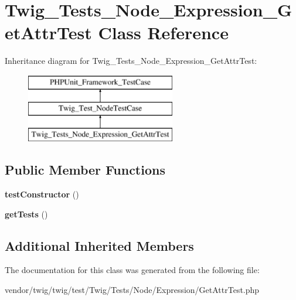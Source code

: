 \hypertarget{classTwig__Tests__Node__Expression__GetAttrTest}{}\section{Twig\+\_\+\+Tests\+\_\+\+Node\+\_\+\+Expression\+\_\+\+Get\+Attr\+Test Class Reference}
\label{classTwig__Tests__Node__Expression__GetAttrTest}
Inheritance diagram for Twig\+\_\+\+Tests\+\_\+\+Node\+\_\+\+Expression\+\_\+\+Get\+Attr\+Test\+:\begin{figure}[H]
\begin{center}
\leavevmode
\includegraphics[height=3.000000cm]{classTwig__Tests__Node__Expression__GetAttrTest}
\end{center}
\end{figure}
\subsection*{Public Member Functions}
\begin{DoxyCompactItemize}
\item 
{\bfseries test\+Constructor} ()\hypertarget{classTwig__Tests__Node__Expression__GetAttrTest_a60eada47fa6795d224dc5a6e51a8227a}{}\label{classTwig__Tests__Node__Expression__GetAttrTest_a60eada47fa6795d224dc5a6e51a8227a}

\item 
{\bfseries get\+Tests} ()\hypertarget{classTwig__Tests__Node__Expression__GetAttrTest_a5b411823e358ccc66a653d4241fb1756}{}\label{classTwig__Tests__Node__Expression__GetAttrTest_a5b411823e358ccc66a653d4241fb1756}

\end{DoxyCompactItemize}
\subsection*{Additional Inherited Members}


The documentation for this class was generated from the following file\+:\begin{DoxyCompactItemize}
\item 
vendor/twig/twig/test/\+Twig/\+Tests/\+Node/\+Expression/Get\+Attr\+Test.\+php\end{DoxyCompactItemize}

